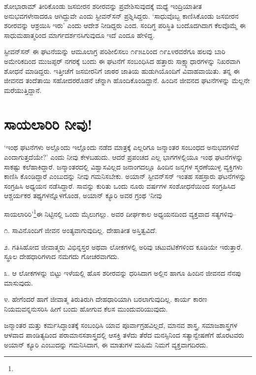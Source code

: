 ಶೋಭಾರಾಮ್ ತೀರಿಕೊಂಡು ಜಸಬೀರನ ಶರೀರವನ್ನು ಪ್ರವೇಶಿಸುವುದಕ್ಕೆ ಮಧ್ಯೆ ಇಂದ್ರಿಯಾ\-ತೀತ ಅನುಭವಗಳೇನಾದರೂ ಆಗಿದ್ದುವೇ ಎಂದು ಸ್ಟೀವನ್​ಸನ್ ಪ್ರಶ್ನಿಸಿದ್ದರು. ‘ಸಾಧುವೊಬ್ಬ ಕಾಣಿಸಿಕೊಂಡು ಜಸಬೀರನ ಶರೀರವನ್ನು ಆಶ್ರಯಿಸಿ ಇರು’ ಎಂದು ಆದೇಶ ನೀಡಿದ್ದರು ಎಂದ. ಸಂದಿಗ್ಧ ಪರಿಸ್ಥಿತಿ ಬಂದೊದಗಿದಾಗ ಕೆಲವೊಮ್ಮೆ ಈ ಸಾಧುಮಹಾತ್ಮರಿಂದ ಮಾರ್ಗದರ್ಶನ\break ಸಿಗುವುದೂ ಇದೆ ಎಂದೂ ಹೇಳಿದ್ದ.

ಸ್ಟೀವನ್​ಸನ್ ಈ ಘಟನೆಯನ್ನು ಆಮೂಲಾಗ್ರ ಪರಿಶೀಲಿಸಲು ೧೯೫೭ರಿಂದ ೧೯೭೪ರ\break ವರೆಗೂ ಹಲವು ಬಾರಿ ಅಮೇರಿಕದಿಂದ ಮುಜಪ್ಫರ್ ನಗರಕ್ಕೆ ಬಂದು ಈ ಘಟನೆಗೆ ಸಂಬಂಧಿಸಿದ ಹತ್ತಾರು ಸಾಕ್ಷ್ಯಾಧಾರಗಳನ್ನು ನಿಖರವಾಗಿ ಶೋಧನೆ ಮಾಡಿದ್ದರು. ಇತ್ತೀಚೆಗೆ ಜಸಬೀರನಿಗೆ ಜಾಠರ ಜಾತಿಯ ಹುಡುಗಿಯೊಂದಿಗೆ ವಿವಾಹವಾಯಿತು. ತನ್ನ ಈ ಜೀವನದ ತಂದೆತಾಯಿ ಸಹೋದರರೊಡನೆ ಚೆನ್ನಾಗಿ ಹೊಂದಿಕೊಂಡಿದ್ದಾನೆ. ಹಿಂದಿನ ಜೀವನದ ಘಟನೆಗಳನ್ನು ಮೆಲ್ಲನೇ ಮರೆಯುತ್ತಿದ್ದಾನೆ.


\section*{ಸಾಯಲಾರಿರಿ ನೀವು!}


{\parfillskip=0pt ‘ಇಂಥ ಘಟನೆಗಳು ಅಲ್ಲೊಂದು ಇಲ್ಲೊಂದು ನಡೆದ ಮಾತ್ರಕ್ಕೆ ಎಲ್ಲರಿಗೂ ಜನ್ಮಾಂತರ ಸಂಬಂಧದ ಅನುಭವಗಳಿವೆ ಎಂದಾಗುತ್ತದೆಯೇ?’ ಎಂದು ನೀವು ಕೇಳಬಹುದು. ಆದರೆ ಪ್ರಪಂಚದ ಎಲ್ಲ ಭಾಗಗಳಲ್ಲಿಯೂ ಇಂಥ ಘಟನೆಗಳನ್ನು ಸಾಕಷ್ಟು ಕಲೆಹಾಕಿದ್ದಾರೆ. ಜನ್ಮಾಂತರದಲ್ಲಿ ವಿಶ್ವಾಸವಿಲ್ಲದ ಜನಾಂಗದಲ್ಲೂ ಹಿಂದಿನ ಜನ್ಮಗಳ ಸ್ಮರಣೆಯುಳ್ಳ ವ್ಯಕ್ತಿಗಳು ಕಾಣಿಸಿ ಕೊಂಡಿದ್ದಾರೆ ಎಂಬುದನ್ನು ನೀವು ಗಮನಿಸಬೇಕು. ಅಯಾನ್ ಸ್ಟೀವನ್​ಸನ್ ಇಂತಹ ಸಹಸ್ರಾರು ಘಟನೆಗಳನ್ನು ಸಂಗ್ರಹಿಸಿ ಅಧ್ಯಯನ ನಡೆಸಿದ್ದಾರೆ. ಸಾವನ್ನು ಕುರಿತು ಒಂದು ನೂರು ವರ್ಷಗಳ ಸಂಶೋಧನೆಯಿಂದ ಸಂಗ್ರಹಿಸಿದ ಆಶ್ಚರ್ಯಕರ ತಥ್ಯಗಳನ್ನೊಳಗೊಂಡ, ಅಯಾನ್ ಕ್ಯೂರಿ ಅವರ ಗ್ರಂಥ ‘ನೀವು\par}\newpage\noindent ಸಾಯಲಾರಿರಿ’\footnote{}ಈ ನಿಟ್ಟಿನಲ್ಲಿ ಒಂದು ಮೈಲುಗಲ್ಲು. ಅವರ ದೀರ್ಘಕಾಲ ಅಧ್ಯಯನದಿಂದ ವ್ಯಕ್ತವಾದ ಸತ್ಯಗಳಿವು–

೧. ಸಾವಿನೊಂದಿಗೆ ಜೀವನ ಅಂತ್ಯವಾಗುವುದಿಲ್ಲ. ದೇಹಾತೀತ ಅಸ್ತಿತ್ವವಿದೆ.

೨. ಗತಿಸಿಹೋದ ಜೀವಾತ್ಮರು ವಿಭಿನ್ನಸ್ತರ ಅಥವಾ ಲೋಕಗಳಲ್ಲಿ ಅರಿವು ಚಟುವಟಿಕೆಗಳಿಂದ ಕೂಡಿಯೇ ಇರುತ್ತಾರೆ. ಸ್ಥೂಲ ದೇಹಧಾರಿಗಳಾದ ನಮಗದು ಗೋಚರವಾಗದು.

೩. ಆ ಲೋಕಗಳನ್ನು ಬಿಟ್ಟು ಇಳೆಯಲ್ಲಿ ಹೊಸ ಶರೀರವನ್ನು ಧರಿಸಿದಾಗ ಅಲ್ಲಿನ ಹಾಗೂ ಹಿಂದಿನ ಜೀವನದ ನೆನಪು ಮಾಸುವುದು.

೪. ಹೇಗೆಂದರೆ ಹಾಗೆ ಜೀವಾತ್ಮ ತಿರುತಿರುಗಿ ದೇಹಧಾರಿಯಾಗಿ ಬರಲಾಗುವುದಿಲ್ಲ. ಕಾರ್ಯ ಕಾರಣ ನಿಯಮವನ್ನನುಸರಿಸಿ ಹೀಗೆ ಬಂದು ಹೋಗುವ ಕೆಲಸ ಮುಂದುವರಿಯುವುದು.

ಜನ್ಮಾಂತರ ಮತ್ತು ಕರ್ಮಸಿದ್ಧಾಂತಕ್ಕೆ ಸಂಬಂಧಿಸಿ ಯಾವ ಪೂರ್ವಾಗ್ರಹವಿಲ್ಲದೆ, ಮಾನವ ಶಾಸ್ತ್ರ, ಸಮಾಜಶಾಸ್ತ್ರಗಳ ಆಳವಾದ ಪಾಂಡಿತ್ಯದಿಂದ ಪರಾಮಾನಸಶಾಸ್ತ್ರದಲ್ಲಿ ಆಸಕ್ತಿ ತಳೆದು ತೆರೆದ ಮನಸ್ಸಿನಿಂದ ಸತ್ಯಾನ್ವೇಷಣೆಗೆ ಹೊರಟವರು ಅಯಾನ್ ಕ್ಯೂರಿ ಎಂಬುದನ್ನು ಗಮನಿಸಿದಾಗ, ಈ ಮಾತುಗಳ ಮಹಿಮೆ ನಿಮಗೆ ವ್ಯಕ್ತವಾಗದಿರದು.


